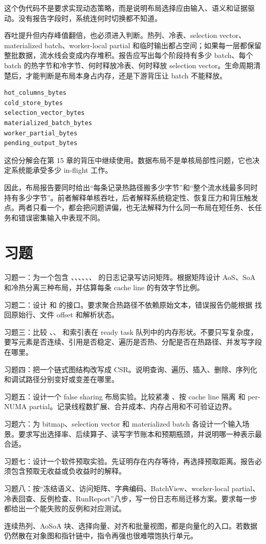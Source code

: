 这个伪代码不是要求实现动态策略，而是说明布局选择应由输入、语义和证据驱动。没有报告字段时，系统连何时切换都不知道。

吞吐提升但内存峰值翻倍，也必须进入判断。热列、冷表、selection vector、materialized batch、worker-local partial 和临时输出都占空间；如果每一层都保留整批数据，流水线会变成内存堆积。报告应写出每个阶段持有多少 batch、每个 batch 的热字节和冷字节、何时释放冷表、何时释放 selection vector。生命周期清楚后，才能判断是布局本身占内存，还是下游背压让 batch 不能释放。

\begin{lstlisting}[numbers=none,caption={布局内存峰值分解}]
hot_columns_bytes
cold_store_bytes
selection_vector_bytes
materialized_batch_bytes
worker_partial_bytes
pending_output_bytes
\end{lstlisting}

这份分解会在第 15 章的背压中继续使用。数据布局不是单核局部性问题，它也决定系统能承受多少 in-flight 工作。

因此，布局报告要同时给出“每条记录热路径搬多少字节”和“整个流水线最多同时持有多少字节”。前者解释单核吞吐，后者解释系统稳定性、恢复压力和背压触发点。两者只看一个，都会把问题讲偏，也无法解释为什么同一布局在短任务、长任务和错误密集输入中表现不同。

\section{习题}

\begin{exercisebox}
习题一：为一个包含 、、、、、、 的日志记录写访问矩阵。根据矩阵设计 AoS、SoA 和冷热分离三种布局，并估算每条 cache line 的有效字节比例。

习题二：设计  和  的接口。要求聚合热路径不依赖原始文本，错误报告仍能根据  找回原始行、文件 offset 和解析状态。

习题三：比较 、、 和索引表在 ready task 队列中的内存形状。不要只写复杂度，要写元素是否连续、引用是否稳定、遍历是否热、分配是否在热路径、并发写字段在哪里。

习题四：把一个链式图结构改写成 CSR。说明查询、遍历、插入、删除、序列化和调试路径分别变好或变差在哪里。

习题五：设计一个 false sharing 布局实验。比较紧凑 、按 cache line 隔离  和 per-NUMA partial。记录线程数扩展、合并成本、内存占用和不可验证边界。

习题六：为 bitmap、selection vector 和 materialized batch 各设计一个输入场景。要求写出选择率、后续算子、读写字节账本和预期瓶颈，并说明哪一种表示最合适。

习题七：设计一个软件预取实验。先证明存在内存等待，再选择预取距离。报告必须包含预取无收益或负收益时的解释。

习题八：按“冻结语义、访问矩阵、字典编码、BatchView、worker-local partial、冷表回查、反例检查、RunReport”八步，写一份日志布局迁移方案。要求每一步都给出一个能失败的反例和对应测试。
\end{exercisebox}

连续热列、AoSoA 块、选择向量、对齐和批量视图，都是向量化的入口。若数据仍然散在对象图和指针链中，指令再强也很难喂饱执行单元。

